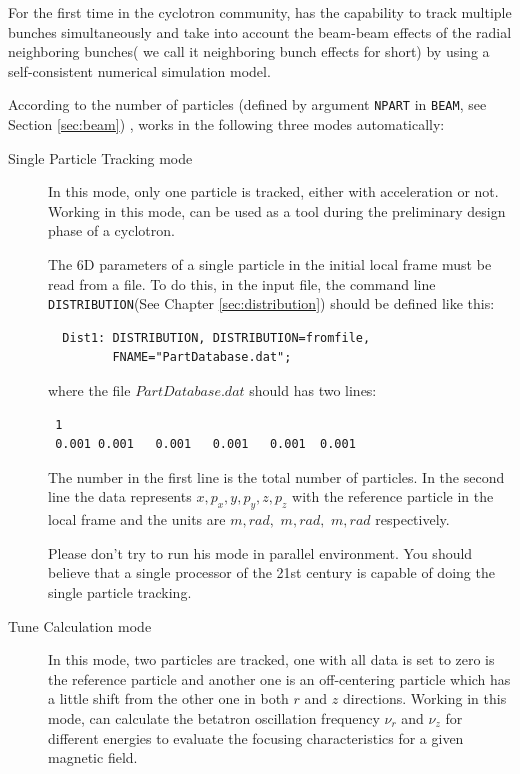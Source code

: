 For the first time in the cyclotron community, \opalcycl has the capability to track multiple bunches simultaneously
and take into account the beam-beam effects of the radial neighboring bunches( we call it neighboring bunch effects for short)
by using a self-consistent numerical simulation model.

According to the number of particles (defined by argument \texttt{NPART} in \texttt{BEAM}, see Section \ref{sec:beam}) , 
\opalcycl works in the following three modes automatically:

\begin{description}

\item[Single Particle Tracking mode]

  In this mode, only one particle is tracked, either with acceleration or not.  Working in this mode, \opalcycl
  can be used as a tool during the preliminary design phase of a cyclotron.  

  The 6D parameters of a single particle in the initial local frame must be read from a file. To do this, in the \opal input file, 
  the command line \texttt{DISTRIBUTION}(See Chapter \ref{sec:distribution}) should be defined like this:
\begin{verbatim}
  Dist1: DISTRIBUTION, DISTRIBUTION=fromfile,
         FNAME="PartDatabase.dat";
\end{verbatim}
 where the file $PartDatabase.dat$ should has two lines:
\begin{verbatim}
 1
 0.001 0.001   0.001   0.001   0.001  0.001    
\end{verbatim}
The number in the first line is the total number of particles.
In the second line the data represents $x, p_x, y,$$ p_y, z, p_z$ with the reference particle 
in the local frame and the units are $m, rad,$ $ m,rad,$ $ m, rad$ respectively.

Please don't try to run his mode in parallel environment. You should believe that a single processor of the 21st century is capable of doing
the single particle tracking.  

\item[Tune Calculation mode]

  In this mode, two particles are tracked, one with all data is set to zero is the reference particle and another one is an off-centering particle 
  which has a little shift from the other one in both $r$ and $z$ directions. Working in this mode, \opalcycl can 
  calculate the betatron oscillation frequency $\nu_r$ and $\nu_z$ for different energies to evaluate the focusing characteristics 
  for a given magnetic field.


\end{description}
